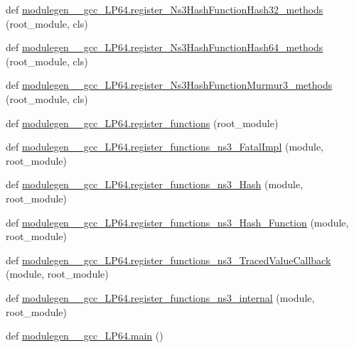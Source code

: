 \begin{DoxyCompactItemize}
\item 
def \hyperlink{namespacemodulegen____gcc__LP64_a9e34b1934e0920db80354937fe083ff8}{modulegen\+\_\+\+\_\+gcc\+\_\+\+L\+P64.\+register\+\_\+\+Ns3\+Hash\+Function\+Hash32\+\_\+methods} (root\+\_\+module, cls)
\item 
def \hyperlink{namespacemodulegen____gcc__LP64_a082871bd62d0a4db1581a4a5a90ef0ac}{modulegen\+\_\+\+\_\+gcc\+\_\+\+L\+P64.\+register\+\_\+\+Ns3\+Hash\+Function\+Hash64\+\_\+methods} (root\+\_\+module, cls)
\item 
def \hyperlink{namespacemodulegen____gcc__LP64_adca5cdfc5ab708e8c329dbbc45251f75}{modulegen\+\_\+\+\_\+gcc\+\_\+\+L\+P64.\+register\+\_\+\+Ns3\+Hash\+Function\+Murmur3\+\_\+methods} (root\+\_\+module, cls)
\item 
def \hyperlink{namespacemodulegen____gcc__LP64_aec4a5f753ed5fb80e971fb72341c9052}{modulegen\+\_\+\+\_\+gcc\+\_\+\+L\+P64.\+register\+\_\+functions} (root\+\_\+module)
\item 
def \hyperlink{namespacemodulegen____gcc__LP64_a50e31627c725d62dd753bad9b750a7a2}{modulegen\+\_\+\+\_\+gcc\+\_\+\+L\+P64.\+register\+\_\+functions\+\_\+ns3\+\_\+\+Fatal\+Impl} (module, root\+\_\+module)
\item 
def \hyperlink{namespacemodulegen____gcc__LP64_aaccaa7a88652c7cf1cbe4bae23dfd70f}{modulegen\+\_\+\+\_\+gcc\+\_\+\+L\+P64.\+register\+\_\+functions\+\_\+ns3\+\_\+\+Hash} (module, root\+\_\+module)
\item 
def \hyperlink{namespacemodulegen____gcc__LP64_ac5702d84dcfdab4237af2580ad57e6cd}{modulegen\+\_\+\+\_\+gcc\+\_\+\+L\+P64.\+register\+\_\+functions\+\_\+ns3\+\_\+\+Hash\+\_\+\+Function} (module, root\+\_\+module)
\item 
def \hyperlink{namespacemodulegen____gcc__LP64_a598936972a1d732adf3c766e058929eb}{modulegen\+\_\+\+\_\+gcc\+\_\+\+L\+P64.\+register\+\_\+functions\+\_\+ns3\+\_\+\+Traced\+Value\+Callback} (module, root\+\_\+module)
\item 
def \hyperlink{namespacemodulegen____gcc__LP64_a630b6ee80068b30f962d5f77d73fd74e}{modulegen\+\_\+\+\_\+gcc\+\_\+\+L\+P64.\+register\+\_\+functions\+\_\+ns3\+\_\+internal} (module, root\+\_\+module)
\item 
def \hyperlink{namespacemodulegen____gcc__LP64_a78c8b268d5fecc4d52d220f8954d0345}{modulegen\+\_\+\+\_\+gcc\+\_\+\+L\+P64.\+main} ()
\end{DoxyCompactItemize}
